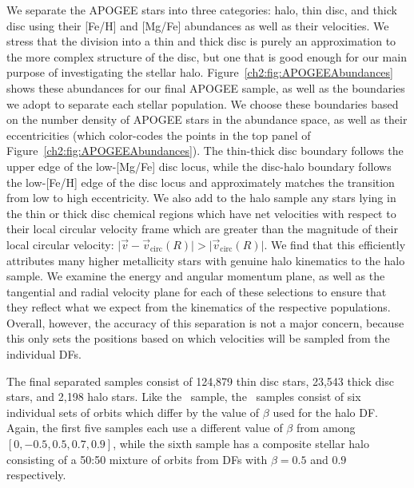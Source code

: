 We separate the APOGEE stars into three categories: halo, thin disc, and thick disc using their [Fe/H] and [Mg/Fe] abundances as well as their velocities. We stress that the division into a thin and thick disc is purely an approximation to the more complex structure of the disc, but one that is good enough for our main purpose of investigating the stellar halo. Figure~\ref{ch2:fig:APOGEEAbundances} shows these abundances for our final APOGEE sample, as well as the boundaries we adopt to separate each stellar population. We choose these boundaries based on the number density of APOGEE stars in the abundance space, as well as their eccentricities (which color-codes the points in the top panel of Figure~\ref{ch2:fig:APOGEEAbundances}). The thin-thick disc boundary follows the upper edge of the low-[Mg/Fe] disc locus, while the disc-halo boundary follows the low-[Fe/H] edge of the disc locus and approximately matches the transition from low to high eccentricity. We also add to the halo sample any stars lying in the thin or thick disc chemical regions which have net velocities with respect to their local circular velocity frame which are greater than the magnitude of their local circular velocity: $\lvert \vec{v} - \vec{v}_\mathrm{circ}(R) \rvert > \lvert \vec{v}_\mathrm{circ}(R) \rvert $. We find that this efficiently attributes many higher metallicity stars with genuine halo kinematics to the halo sample. We examine the energy and angular momentum plane, as well as the tangential and radial velocity plane for each of these selections to ensure that they reflect what we expect from the kinematics of the respective populations. Overall, however, the accuracy of this separation is not a major concern, because this only sets the positions based on which velocities will be sampled from the individual DFs. 

The final separated samples consist of 124,879 thin disc stars, 23,543 thick disc stars, and 2,198 halo stars. Like the \solar\ sample, the \survey\ samples consist of six individual sets of orbits which differ by the value of $\beta$ used for the halo DF. Again, the first five samples each use a different value of $\beta$ from among $[0,-0.5,0.5,0.7,0.9]$, while the sixth sample has a composite stellar halo consisting of a 50:50 mixture of orbits from DFs with $\beta=0.5$ and $0.9$ respectively.

